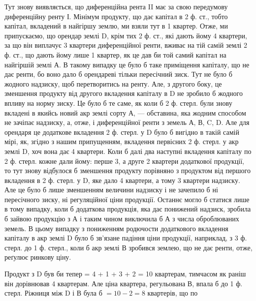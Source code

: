 Тут знову виявляється, що диференційна рента II має за свою передумову
диференційну ренту І. Мінімум продукту, що дає капітал в 2 ф. ст.,
тобто капітал, вкладений в найгіршу землю, ми взяли тут в 1 квартер.
Отже, ми припускаємо, що орендар землі D, крім тих 2 ф. ст., які
дають йому 4 квартери, за що він виплачує 3 квартери диференційної ренти, вживає
на тій самій землі 2 ф. ст., що дають йому лише 1 квартер, як це дав
би той самий капітал на
найгіршій землі А. В такому випадку це було б таке приміщення капіталу,
що не дає ренти, бо воно дало б орендареві тільки пересічний зиск. Тут не
було б жодного надзиску, щоб перетворитись на ренту. Але, з другого боку, це
зменшення продукту від другого вкладення капіталу в D не зробило б жодного
впливу на норму зиску. Це було б те саме, як коли б 2 ф. стерл. були
знову вкладені в якийсь новий акр землі сорту А, — обставина, яка жодним способом
не зачіпає надзиску, а, отже, і диференційної ренти з земель А, В, C, D.
Але для орендаря це додаткове вкладення 2 ф. стерл. у D було б вигідно
в такій самій мірі, як, згідно з нашим припущенням, вкладення первісних
2 ф. стерл. у акр землі D, хоч вона дає 4 квартери. Коли б далі два наступні
вкладення капіталу по 2 ф. стерл. кожне дали йому: перше 3, а друге
2 квартери додаткової продукції, то тут знову відбулося б зменшення продукту
порівняно з продуктом від першого вкладення в 2 ф. стерл. у D, яке
дало 4 квартери, а тому 3 квартери надзиску. Але це було б лише зменшенням
величини надзиску і не зачепило б ні пересічного зиску, ні регуляційної ціни
продукції. Останнє могло б статися лише в тому випадку, коли б додаткова
продукція, яка дає понижений надзиск, зробила б зайвою продукцію з А і таким
чином виключила б А з числа оброблюваних земель. В цьому випадку
з пониженням родючости додаткового вкладення капіталу в акр землі D було б
зв’язане падіння ціни продукції, наприклад, з 3 ф. стерл. до 1 ф. стерл.,
коли б акр землі В зробився землею, що не дає ренти, отже, реґулює ринкову ціну.

Продукт з D був би тепер = 4 + 1 + 3 + 2 = 10 квартерам, тимчасом
як раніш він дорівнював 4 квартерам. Але ціна квартера, регульована В, впала б
до 1 ф. стерл. Ріжниця між D і В була б $= 10 - 2 = 8$ квартерів, що по
\parbreak{}  %
